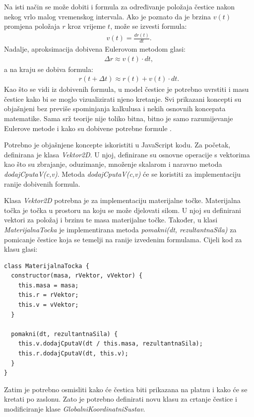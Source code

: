 \documentclass{foi}
\begin{document}
Na isti način se može dobiti i formula za određivanje položaja čestice nakon nekog vrlo malog vremenskog intervala. Ako je poznato da je brzina $v(t)$ promjena položaja $r$ kroz vrijeme $t$, može se izvesti formula:
 \begin{align*}
v(t) = \frac{dr(t)}{dt}.
\end{align*}
Nadalje, aproksimacija dobivena Eulerovom metodom glasi:
 \begin{align*}
\Delta r \approx v(t) \cdot dt,
\end{align*}
a na kraju se dobiva formula:
 \begin{align*}
r(t + \Delta t) \approx r(t) + v(t) \cdot dt.
\end{align*}
Kao što se vidi iz dobivenih formula, u model čestice je potrebno uvrstiti i masu čestice kako bi se moglo vizualizirati njeno kretanje. Svi prikazani koncepti su objašnjeni bez previše spominjanja kalkulusa i nekih osnovnih koncepata matematike. Sama srž teorije nije toliko bitna, bitno je samo razumijevanje Eulerove metode i kako su dobivene potrebne formule \parencite{HipHorvatFizika}.

Potrebno je objašnjene koncepte iskoristiti u JavaScript kodu. Za početak, definirana je klasa \textit{Vektor2D}. U njoj, definirane su osnovne operacije s vektorima kao što su zbrajanje, oduzimanje, množenje skalarom i naravno metoda \textit{dodajCputaV(c,v)}. Metoda \textit{dodajCputaV(c,v)} će se koristiti za implementaciju ranije dobivenih formula.

Klasa \textit{Vektor2D} potrebna je za implementaciju materijalne točke. Materijalna točka je točka u prostoru na koju se može djelovati silom. U njoj su definirani vektori za položaj i brzinu te masa materijalne točke. Također, u klasi \textit{MaterijalnaTocka} je implementirana metoda \textit{pomakni(dt, rezultantnaSila)} za pomicanje čestice koja se temelji na ranije izvedenim formulama. Cijeli kod za klasu glasi:

\begin{verbatim}
class MaterijalnaTocka {
  constructor(masa, rVektor, vVektor) {
    this.masa = masa;
    this.r = rVektor;
    this.v = vVektor;
  }

  pomakni(dt, rezultantnaSila) {
    this.v.dodajCputaV(dt / this.masa, rezultantnaSila);
    this.r.dodajCputaV(dt, this.v);
  }
}
\end{verbatim}

Zatim je potrebno osmisliti kako će čestica biti prikazana na platnu i kako će se kretati po zaslonu. Zato je potrebno definirati novu klasu za crtanje čestice i modificiranje klase \textit{GlobalniKoordinatniSustav}. 
\end{document}
